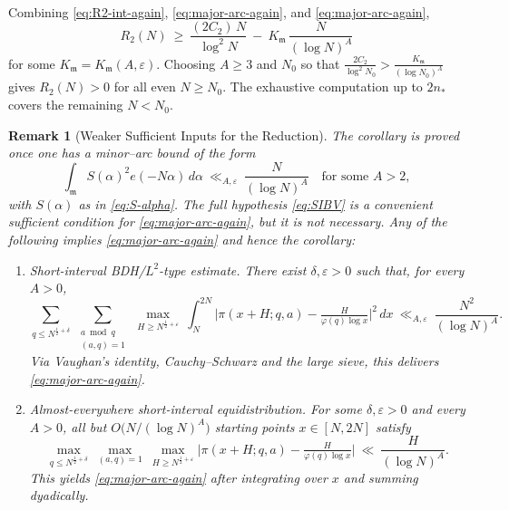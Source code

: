 \documentclass[11pt]{article}
\makeatletter
\theoremstyle{inline}
\newtheorem*{remark}{Remark}
\theoremstyle{break}
\renewenvironment{proof}[1][\proofname]{%
  \par\pushQED{\qed}%
  \normalfont \topsep6\p@\@plus6\p@\relax
  \trivlist
  \item[\hskip\labelsep
        \itshape
    #1\@addpunct{.}]\mbox{}\\  %
}{%
  \popQED\endtrivlist\@endpefalse
}
\theoremstyle{break}
\theoremstyle{break}
\theoremstyle{break}
\theoremstyle{break}
\theoremstyle{break}
\theoremstyle{break}
\theoremstyle{inline}
\newcommand{\Kminor}{K_{\mathfrak m}}           %
\newcommand{\nprodstar}{n_{\ast}}  %
\makeatother
\begin{document}
\begin{proof}
\medskip
Combining \eqref{eq:R2-int-again}, \eqref{eq:major-arc-again}, and \eqref{eq:major-arc-again},
\begin{equation}
R_2(N)\ \ge\ \frac{(2C_2)\,N}{\log^2 N}\ -\ \Kminor\,\frac{N}{(\log N)^A}
\end{equation}
for some \(\Kminor=\Kminor(A,\varepsilon)\). Choosing \(A\ge 3\) and \(N_0\) so that \(\frac{2C_2}{\log^2 N_0}>\frac{\Kminor}{(\log N_0)^A}\) gives \(R_2(N)>0\) for all even \(N\ge N_0\). The exhaustive computation up to \(2\nprodstar\) covers the remaining \(N< N_0\).
\end{proof}

\begin{remark}[Weaker Sufficient Inputs for the Reduction]
\label{rem:weaker-inputs}
The corollary is proved once one has a minor--arc bound of the form
\begin{equation}\label{eq:major-arc-again}
\int_{\mathfrak m} S(\alpha)^2 e(-N\alpha)\,d\alpha\ \ll_{A,\varepsilon}\ \frac{N}{(\log N)^A}
\quad\text{for some }A>2,
\end{equation}
with \(S(\alpha)\) as in \eqref{eq:S-alpha}. The full hypothesis \eqref{eq:SIBV} is a convenient sufficient condition for \eqref{eq:major-arc-again}, but it is not necessary. Any of the following implies \eqref{eq:major-arc-again} and hence the corollary:

\begin{enumerate}
\item[\textnormal{(i)}] \emph{Short-interval BDH/\(L^2\)-type estimate.}
There exist \(\delta,\varepsilon>0\) such that, for every \(A>0\),
\begin{equation}
\sum_{q\le N^{\frac{1}{2}+\delta}}\ \sum_{\substack{a\bmod q\\(a,q)=1}}
\ \max_{H\ge N^{\frac{1}{2}+\varepsilon}}\ 
\int_{N}^{2N}\bigl|\pi(x+H;q,a)-\tfrac{H}{\varphi(q)\log x}\bigr|^2\,dx
\ \ll_{A,\varepsilon}\ \frac{N^2}{(\log N)^A}.
\end{equation}
Via Vaughan’s identity, Cauchy–Schwarz and the large sieve, this delivers \eqref{eq:major-arc-again}.

\item[\textnormal{(ii)}] \emph{Almost-everywhere short-interval equidistribution.}
For some \(\delta,\varepsilon>0\) and every \(A>0\), all but \(O\!\big(N/(\log N)^A\big)\) starting points \(x\in[N,2N]\) satisfy
\[
\max_{q\le N^{\frac{1}{2}+\delta}}\ \max_{(a,q)=1}\ \max_{H\ge N^{\frac{1}{2}+\varepsilon}}
\bigl|\pi(x+H;q,a)-\tfrac{H}{\varphi(q)\log x}\bigr|\ \ll\ \frac{H}{(\log N)^{A}}.
\]
This yields \eqref{eq:major-arc-again} after integrating over \(x\) and summing dyadically.


\end{enumerate}
\end{remark}
\end{document}
